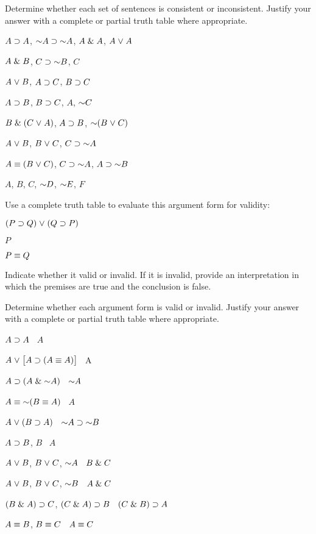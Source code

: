 \solutions
\problempart
\label{pr.TT.consistent}
Determine whether each set of sentences is consistent or inconsistent. Justify your answer with a complete or partial truth table where appropriate.
\begin{earg}
\item $A\supset A$, $\enot A \eif \enot A$, $A\mathrel\& A$, $A\mkern1mu\vee\mkern1mu A$ %
\item $A \mathrel\& B$, $C\eif \enot B$, $C$ %
\item $A\mkern1mu\vee\mkern1mu B$, $A\supset C$, $B\supset C$ %
\item $A\supset B$, $B\supset C$, $A$, $\enot C$ %
\item $B\mathrel\&(C\mkern1mu\vee\mkern1mu A)$, $A\supset B$, $\enot(B\eor C)$  %
\item $A \mkern1mu\vee\mkern1mu B$, $B\mkern1mu\vee\mkern1mu C$, $C\eif \enot A$ %
\item $A\equiv(B\mkern1mu\vee\mkern1mu C)$, $C\eif \enot A$, $A\eif \enot B$ %
\item $A$, $B$, $C$, $\enot D$, $\enot E$, $F$ %
\end{earg}




\problempart
\label{HW3.B}

Use a complete truth table to evaluate this argument form for validity:

\begin{earg}
\item[] $(P \supset Q) \mkern1mu\vee\mkern1mu (Q \supset P)$
\item[] $P$
\item[\therefore] $P\equiv Q$
\end{earg}

Indicate whether it valid or invalid.
If it is invalid, provide an interpretation in which the premises are true and the conclusion is false.




\solutions
\problempart
\label{pr.TT.valid}
Determine whether each argument form is valid or invalid. Justify your answer with a complete or partial truth table where appropriate.
\begin{earg}
\item $A\supset A$ \therefore\ $A$ %
\item $A\mkern1mu\vee\mkern1mu\bigl[A\supset(A\equiv A)\bigr]$ \therefore\ A %
\item $A\eif(A\eand\enot A)$ \therefore\ $\enot A$ %
\item $A\eiff\enot(B\eiff A)$ \therefore\ $A$ %
\item $A\mkern1mu\vee\mkern1mu(B\supset A)$ \therefore\ $\enot A \eif \enot B$ %
\item $A\supset B$, $B$ \therefore\ $A$ %
\item $A\mkern1mu\vee\mkern1mu B$, $B\mkern1mu\vee\mkern1mu C$, $\enot A$ \therefore\ $B \mathrel\& C$ %
\item $A\mkern1mu\vee\mkern1mu B$, $B\mkern1mu\vee\mkern1mu C$, $\enot B$ \therefore\ $A \mathrel\& C$ %
\item $(B\mathrel\& A)\supset C$, $(C\mathrel\& A)\supset B$ \therefore\ $(C\mathrel\& B)\supset A$ %
\item $A\equiv B$, $B\equiv C$ \therefore\ $A\equiv C$ %
\end{earg}

